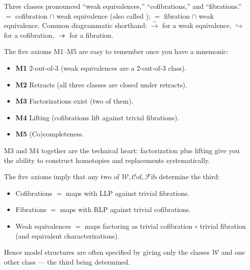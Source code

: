 \begin{howtosay}
Three classes pronounced ``weak equivalences,'' ``cofibrations,'' and
``fibrations.''  $=$ cofibration $\cap$ weak
equivalence (also called );  $=$ fibration $\cap$ weak equivalence. Common diagrammatic
shorthand: $\xrightarrow{\sim}$ for a weak equivalence, $\hookrightarrow$ for
a cofibration, $\twoheadrightarrow$ for a fibration.
\end{howtosay}

\begin{readernote}
The five axioms M1--M5 are easy to remember once you have a mnemonic:
\begin{itemize}
  \item \textbf{M1} 2-out-of-3 (weak equivalences are a 2-out-of-3 class).
  \item \textbf{M2} Retracts (all three classes are closed under retracts).
  \item \textbf{M3} Factorizations exist (two of them).
  \item \textbf{M4} Lifting (cofibrations lift against trivial fibrations).
  \item \textbf{M5} (Co)completeness.
\end{itemize}
M3 and M4 together are the technical heart: factorization plus lifting
give you the ability to construct homotopies and replacements
systematically.
\end{readernote}

\begin{remark}
\label{rem:two-determine-three}
The five axioms imply that any two of $\mathcal{W}, \mathcal{C}\mathrm{of},
\mathcal{F}\mathrm{ib}$ determine the third:
\begin{itemize}
  \item Cofibrations $=$ maps with LLP against trivial fibrations.
  \item Fibrations $=$ maps with RLP against trivial cofibrations.
  \item Weak equivalences $=$ maps factoring as trivial cofibration $\circ$ trivial fibration (and equivalent characterizations).
\end{itemize}
Hence model structures are often specified by giving only the classes
$\mathcal{W}$ and one other class — the third being determined.
\end{remark}


